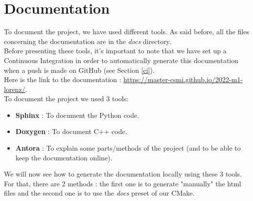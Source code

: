 \newpage

\section{Documentation}
\label{doc}

	To document the project, we have used different tools. As said before, all the files concerning the documentation are in the \textit{docs} directory. \\
	Before presenting these tools, it's important to note that we have set up a Continuous Integration in order to automatically generate this documentation when a push is made on GitHub (see Section \ref{ci}). \\
	Here is the link to the documentation : \url{https://master-csmi.github.io/2022-m1-lorenz/}. \\
	To document the project we used 3 tools:
	\begin{itemize}[label=-]
		\item \textbf{Sphinx\cite{sphinx_doc}} : To document the Python code. 
		\item \textbf{Doxygen\cite{doxygen_doc}} : To document C++ code.
		\item \textbf{Antora\cite{antora_doc}} : To explain some parts/methods of the project (and to be able to keep the documentation online).
	\end{itemize}
	We will now see how to generate the documentation locally using these 3 tools. For that, there are 2 methods : the first one is to generate "manually" the html files and the second one is to use the \textit{docs} preset of our CMake.
